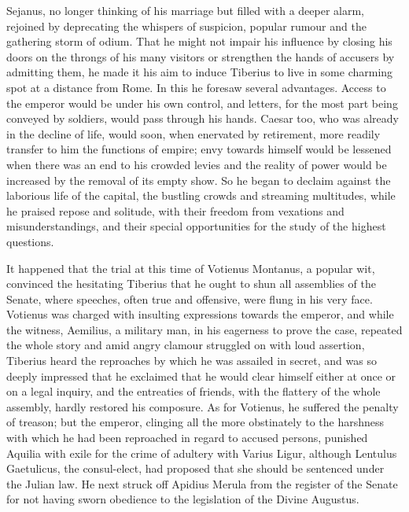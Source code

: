 
Sejanus, no longer thinking of his marriage but filled with a deeper alarm, rejoined by deprecating the whispers of suspicion, popular rumour and the gathering storm of odium. That he might not impair his influence by closing his doors on the throngs of his many visitors or strengthen the hands of accusers by admitting them, he made it his aim to induce Tiberius to live in some charming spot at a distance from Rome. In this he foresaw several advantages. Access to the emperor would be under his own control, and letters, for the most part being conveyed by soldiers, would pass through his hands. Caesar too, who was already in the decline of life, would soon, when enervated by retirement, more readily transfer to him the functions of empire; envy towards himself would be lessened when there was an end to his crowded levies and the reality of power would be increased by the removal of its empty show. So he began to declaim against the laborious life of the capital, the bustling crowds and streaming multitudes, while he praised repose and solitude, with their freedom from vexations and misunderstandings, and their special opportunities for the study of the highest questions.


It happened that the trial at this time of Votienus Montanus, a popular wit, convinced the hesitating Tiberius that he ought to shun all assemblies of the Senate, where speeches, often true and offensive, were flung in his very face. Votienus was charged with insulting expressions towards the emperor, and while the witness, Aemilius, a military man, in his eagerness to prove the case, repeated the whole story and amid angry clamour struggled on with loud assertion, Tiberius heard the reproaches by which he was assailed in secret, and was so deeply impressed that he exclaimed that he would clear himself either at once or on a legal inquiry, and the entreaties of friends, with the flattery of the whole assembly, hardly restored his composure. As for Votienus, he suffered the penalty of treason; but the emperor, clinging all the more obstinately to the harshness with which he had been reproached in regard to accused persons, punished Aquilia with exile for the crime of adultery with Varius Ligur, although Lentulus Gaetulicus, the consul-elect, had proposed that she should be sentenced under the Julian law. He next struck off Apidius Merula from the register of the Senate for not having sworn obedience to the legislation of the Divine Augustus.

